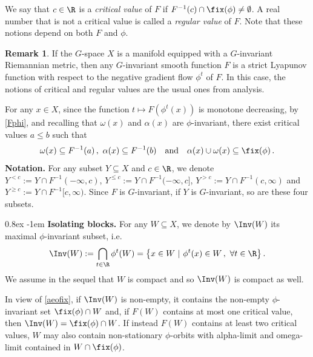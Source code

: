 \documentclass[11pt,a4paper,reqno]{article}
\makeatletter
\renewcommand{\paragraph}{%
  \@startsection{paragraph}{4}{\z@}%
  {0.8ex}  %
  {-1em}   %
  {\normalfont\bfseries}%
}
\numberwithin{equation}{section}
\theoremstyle{definition}
\newtheorem{remark}[theorem]{Remark}
\makeatother
\begin{document}
 We say that $c\in\R$ is a \emph{critical value} of $F$ if $F^{-1}(c)\cap\fix(\phi)\neq\emptyset$. A real number that is not a critical value is called a \emph{regular value} of $F$. Note that these notions depend on both $F$ and $\phi$. 


\begin{remark}
If the $G$-space $X$ is a  manifold equipped with a $G$-invariant Riemannian metric, then any $G$-invariant smooth function $F$ is a strict Lyapunov function with respect to  the negative gradient flow $\phi^t$ of $F$. In this case, the notions of critical and regular values are the usual ones from analysis. 
\end{remark}

For any $x\in X$, since the function $t\mapsto F(\phi^t(x))$ is monotone decreasing, 
by  \eqref{Fphi}, and 
recalling that 
$ \omega (x)$ and $\alpha(x) $ are $ \phi $-invariant,  
there exist critical values  $a\leq b$ such that 
\begin{equation}\label{aeofix}
\omega(x)\subseteq F^{-1}(a) \, , \ 
\alpha(x)\subseteq F^{-1}(b) \quad \text{and} \quad 
\alpha(x)\cup\omega(x)\subseteq\fix(\phi) \, .
\end{equation}
{\bf Notation.} For any subset $Y\subseteq X$ and $c\in\R$, we denote
$ Y^{<c} :=Y\cap F^{-1}(-\infty,c) $, 
$
    Y^{\leq c}:=Y\cap F^{-1}(-\infty,c] $, 
    $ Y^{>c} :=Y\cap F^{-1}(c,\infty) $
    and 
$ Y^{\geq c}:=Y\cap F^{-1}[c,\infty) $. 
Since $ F $ is $ G $-invariant, if $Y$ is $G$-invariant, so are 
these four subsets.



\paragraph{\bf Isolating blocks.} 
For any $W\subseteq X$, we denote by $\Inv(W)$ its maximal $\phi$-invariant subset, i.e.
\begin{align*}
    \Inv(W):=\bigcap_{t\in\R} \phi^t(W)= \big\{ x \in W \ | 
    \ 
    \phi^t(x) \in W \, , \ 
    \forall t \in \R \big\} \, .
\end{align*}
We assume in the sequel that $W$ is compact and so 
 $\Inv(W)$ is compact as well. 

In view of 
\eqref{aeofix}, if $\Inv(W)$ is non-empty, it contains the non-empty $\phi$-invariant set  $\fix(\phi)\cap W$
and, if $F(W)$ contains at most one critical value, then $\Inv(W)=\fix(\phi)\cap W$. If instead $F(W)$ contains at least two critical values, $W$ may also contain non-stationary $\phi$-orbits with alpha-limit and omega-limit contained in  $W\cap\fix(\phi)$.
\end{document}

